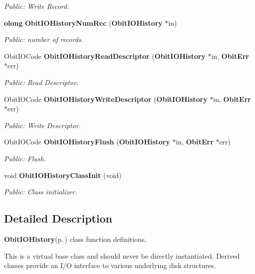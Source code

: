 \begin{CompactItemize}
\begin{CompactList}\small\item\em Public: Write Record. \item\end{CompactList}\item 
{\bf olong} {\bf Obit\-IOHistory\-Num\-Rec} ({\bf Obit\-IOHistory} $\ast$in)
\begin{CompactList}\small\item\em Public: number of records. \item\end{CompactList}\item 
Obit\-IOCode {\bf Obit\-IOHistory\-Read\-Descriptor} ({\bf Obit\-IOHistory} $\ast$in, {\bf Obit\-Err} $\ast$err)
\begin{CompactList}\small\item\em Public: Read Descriptor. \item\end{CompactList}\item 
Obit\-IOCode {\bf Obit\-IOHistory\-Write\-Descriptor} ({\bf Obit\-IOHistory} $\ast$in, {\bf Obit\-Err} $\ast$err)
\begin{CompactList}\small\item\em Public: Write Descriptor. \item\end{CompactList}\item 
Obit\-IOCode {\bf Obit\-IOHistory\-Flush} ({\bf Obit\-IOHistory} $\ast$in, {\bf Obit\-Err} $\ast$err)
\begin{CompactList}\small\item\em Public: Flush. \item\end{CompactList}\item 
void {\bf Obit\-IOHistory\-Class\-Init} (void)
\begin{CompactList}\small\item\em Public: Class initializer. \item\end{CompactList}\end{CompactItemize}


\subsection{Detailed Description}
{\bf Obit\-IOHistory}{\rm (p.\,\pageref{structObitIOHistory})} class function definitions. 

This is a virtual base class and should never be directly instantiated. Derived classes provide an I/O interface to various underlying disk structures.

